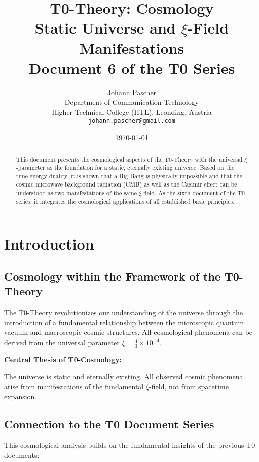 \documentclass[12pt,a4paper]{article}
\title{\textbf{T0-Theory: Cosmology}\\[0.5cm]
	\large Static Universe and $\xi$-Field Manifestations\\[0.3cm]
	\normalsize Document 6 of the T0 Series}
\author{Johann Pascher\\
	Department of Communication Technology\\
	Higher Technical College (HTL), Leonding, Austria\\
	\texttt{johann.pascher@gmail.com}}
\date{\today}
\newcommand{\xipar}{\xi}
\begin{document}
	
	\maketitle
	
	\begin{abstract}
		This document presents the cosmological aspects of the T0-Theory with the universal $\xi$-parameter as the foundation for a static, eternally existing universe. Based on the time-energy duality, it is shown that a Big Bang is physically impossible and that the cosmic microwave background radiation (CMB) as well as the Casimir effect can be understood as two manifestations of the same $\xi$-field. As the sixth document of the T0 series, it integrates the cosmological applications of all established basic principles.
	\end{abstract}
	
	\tableofcontents
	\newpage
	
	\section{Introduction}
	
	\subsection{Cosmology within the Framework of the T0-Theory}
	
	The T0-Theory revolutionizes our understanding of the universe through the introduction of a fundamental relationship between the microscopic quantum vacuum and macroscopic cosmic structures. All cosmological phenomena can be derived from the universal parameter $\xipar = \frac{4}{3} \times 10^{-4}$.
	
	\begin{keyresult}
		\textbf{Central Thesis of T0-Cosmology:}
		
		The universe is static and eternally existing. All observed cosmic phenomena arise from manifestations of the fundamental $\xi$-field, not from spacetime expansion.
	\end{keyresult}
	
	\subsection{Connection to the T0 Document Series}
	
	This cosmological analysis builds on the fundamental insights of the previous T0 documents:
	
\end{document}
